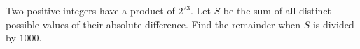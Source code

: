 Two positive integers have a product of $2^{23}$. Let $S$ be the sum of all distinct possible values of their absolute difference. Find the remainder when $S$ is divided by $1000$.
